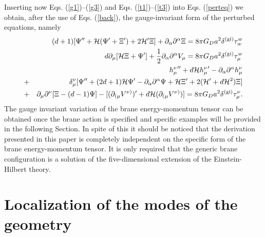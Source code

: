 \documentclass[a4paper,12pt]{article}
\begin{document}
Inserting now Eqs. (\ref{g1})--(\ref{g3}) and Eqs. (\ref{t1})--(\ref{t3}) 
into Eqs. (\ref{perteq}) we obtain, after the use of Eqs. 
(\ref{back}), the gauge-invariant form of the perturbed equations, namely
\begin{eqnarray}
&&(d + 1)[\Psi'' + {\cal H} ( \Psi' + \Xi') + 2 {\cal H}' \Xi] + 
\partial_{\alpha}\partial^{\alpha} \Xi = 8 \pi G_{D} a^2 \delta^{({\rm gi})}
\tau_{w}^{w}
\label{eq1}\\
&&  d \partial_{\mu}[
{\cal H} \Xi + \Psi'] + \frac{1}{2} \partial_{\alpha}\partial^{\alpha} V_{\mu}
=8 \pi G_{D} a^2 \delta^{({\rm gi})}
\tau_{\mu}^{w}
\label{eq2}\\
&& {h_{\mu}^{\nu}}''
+ d {\cal H} {h_{\mu}^{\nu}}' - \partial_{\alpha} \partial^{\alpha} 
h_{\mu}^{\nu}  
\nonumber\\
&+& \delta_{\mu}^{\nu} [ \Psi'' + ( 2 d + 1) {\cal H} \Psi' - 
\partial_{\alpha} \partial^{\alpha} \Psi + {\cal H} \Xi' + 
2 ( {\cal H}' + d {\cal H}^2) \Xi] 
\nonumber\\
&+& \partial_{\mu} \partial^{\nu} [ \Xi 
- ( d - 1) \Psi] - [ (\partial_{(\mu}V^{\nu)})' + d {\cal H} 
(\partial_{(\mu} V^{\nu)})]=8 \pi G_{D} a^2 \delta^{({\rm gi})}
\tau_{\mu}^{\nu}.
\label{eq3}
\end{eqnarray}
The gauge invariant variation of the brane energy-momentum 
tensor can be obtained once the brane action is specified and specific 
examples will be provided in the following Section. In spite of this
it should be noticed that the derivation presented in this 
paper is completely independent on the specific form of the 
brane energy-momentum tensor. It is only required that the 
generic brane configuration is a solution of the 
five-dimensional extension of the Einstein-Hilbert theory.

\renewcommand{\theequation}{3.\arabic{equation}}
\setcounter{equation}{0}
\section{Localization of the modes of the geometry} 
\end{document}

